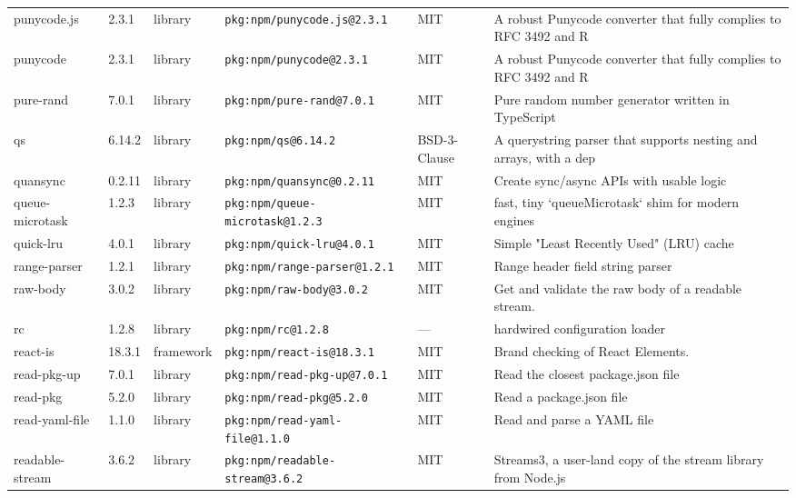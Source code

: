 \documentclass[11pt,a4paper]{article}
\begin{document}
\begin{longtable}{|p{4cm}|p{2cm}|p{1.6cm}|p{5cm}|p{1.5cm}|p{3.5cm}|}
\raggedright punycode.js & 2.3.1 & library & \small\texttt{pkg:npm/punycode.js@2.3.1} & MIT & \small A robust Punycode converter that fully complies to RFC 3492 and R \\
\raggedright punycode & 2.3.1 & library & \small\texttt{pkg:npm/punycode@2.3.1} & MIT & \small A robust Punycode converter that fully complies to RFC 3492 and R \\
\raggedright pure-rand & 7.0.1 & library & \small\texttt{pkg:npm/pure-rand@7.0.1} & MIT & \small  Pure random number generator written in TypeScript \\
\raggedright qs & 6.14.2 & library & \small\texttt{pkg:npm/qs@6.14.2} & BSD-3-Clause & \small A querystring parser that supports nesting and arrays, with a dep \\
\raggedright quansync & 0.2.11 & library & \small\texttt{pkg:npm/quansync@0.2.11} & MIT & \small Create sync/async APIs with usable logic \\
\raggedright queue-microtask & 1.2.3 & library & \small\texttt{pkg:npm/queue-microtask@1.2.3} & MIT & \small fast, tiny `queueMicrotask` shim for modern engines \\
\raggedright quick-lru & 4.0.1 & library & \small\texttt{pkg:npm/quick-lru@4.0.1} & MIT & \small Simple "Least Recently Used" (LRU) cache \\
\raggedright range-parser & 1.2.1 & library & \small\texttt{pkg:npm/range-parser@1.2.1} & MIT & \small Range header field string parser \\
\raggedright raw-body & 3.0.2 & library & \small\texttt{pkg:npm/raw-body@3.0.2} & MIT & \small Get and validate the raw body of a readable stream. \\
\raggedright rc & 1.2.8 & library & \small\texttt{pkg:npm/rc@1.2.8} & — & \small hardwired configuration loader \\
\raggedright react-is & 18.3.1 & framework & \small\texttt{pkg:npm/react-is@18.3.1} & MIT & \small Brand checking of React Elements. \\
\raggedright read-pkg-up & 7.0.1 & library & \small\texttt{pkg:npm/read-pkg-up@7.0.1} & MIT & \small Read the closest package.json file \\
\raggedright read-pkg & 5.2.0 & library & \small\texttt{pkg:npm/read-pkg@5.2.0} & MIT & \small Read a package.json file \\
\raggedright read-yaml-file & 1.1.0 & library & \small\texttt{pkg:npm/read-yaml-file@1.1.0} & MIT & \small Read and parse a YAML file \\
\raggedright readable-stream & 3.6.2 & library & \small\texttt{pkg:npm/readable-stream@3.6.2} & MIT & \small Streams3, a user-land copy of the stream library from Node.js \\

\end{longtable}
\end{document}
